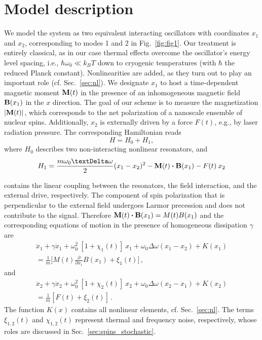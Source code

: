 \section{Model description} \label{sec:spins_model}

We model the system as two equivalent interacting oscillators with coordinates $x_1$ and $x_2$, corresponding to modes 1 and 2 in Fig.~\ref{fig:fig1}. Our treatment is entirely classical, as in our case thermal effects overcome the oscillator's energy level spacing, i.e.,  $\hbar\omega_0 \ll k_B T$ down to cryogenic temperatures (with $\hbar$ the reduced Planck constant). Nonlinearities are added, as they turn out to play an important role (cf. Sec.~\ref{sec:nl}). We designate $x_1$ to host a time-dependent magnetic moment $\vb{M}(t)$ in the presence of an inhomogeneous magnetic field $\vb{B}(x_1)$ in the $x$ direction. The goal of our scheme is to measure the magnetization $\abs{\vb{M}(t)}$, which corresponds to the net polarization of a nanoscale ensemble of nuclear spins. Additionally, $x_2$ is externally driven by a force $F(t)$, e.g., by laser radiation pressure. The corresponding Hamiltonian reads
\begin{equation}
H = H_0 + H_{1},
\end{equation}
where $H_0$ describes two non-interacting nonlinear resonators, and
\begin{equation} \label{eq:hamiltonian}
H_{1} = \frac{m \omega_0 \Delta \omega}{2} (x_1 - x_2)^2  - \vb{M}(t) \vdot \vb{B}(x_1) - F(t)\: x_2
\end{equation}

contains the linear coupling between the resonators, the field interaction, and the external drive, respectively. The component of spin polarization that is perpendicular to the external field undergoes Larmor precession and does not contribute to the signal. Therefore $\vb{M}(t) \vdot \vb{B}(x_1) = M(t) B(x_1)$ and the corresponding equations of motion in the presence of homogeneous dissipation $\gamma$ are
\begin{multline} \label{eq:x1}
\ddot{x}_1 + \gamma \dot{x}_1 + \omega_0^2\: [1 + \chi_1(t)] \:x_1 + \omega_0 \Delta \omega (x_1 - x_2) +K(x_1)\\
= \frac{1}{m} \bigg[M(t)\frac{\partial}{\partial x_1} B(x_1) +  \xi_1(t)\bigg] \,,
\end{multline}
and
\begin{multline} \label{eq:x2}
\ddot{x}_2 + \gamma \dot{x}_2 + \omega_0^2\: [1 + \chi_2(t)] \:x_2 +  \omega_0 \Delta \omega (x_2 - x_1) +K(x_2)\\
= \frac{1}{m} [F(t) + \xi_2(t)] \,.
\end{multline}
The function $K(x)$ contains all nonlinear elements, cf. Sec.~\ref{sec:nl}. The terms $\xi_{1,2}(t)$ and $\chi_{1,2}(t)$ represent thermal and frequency noise, respectively, whose roles are discussed in Sec.~\ref{sec:spins_stochastic}.


